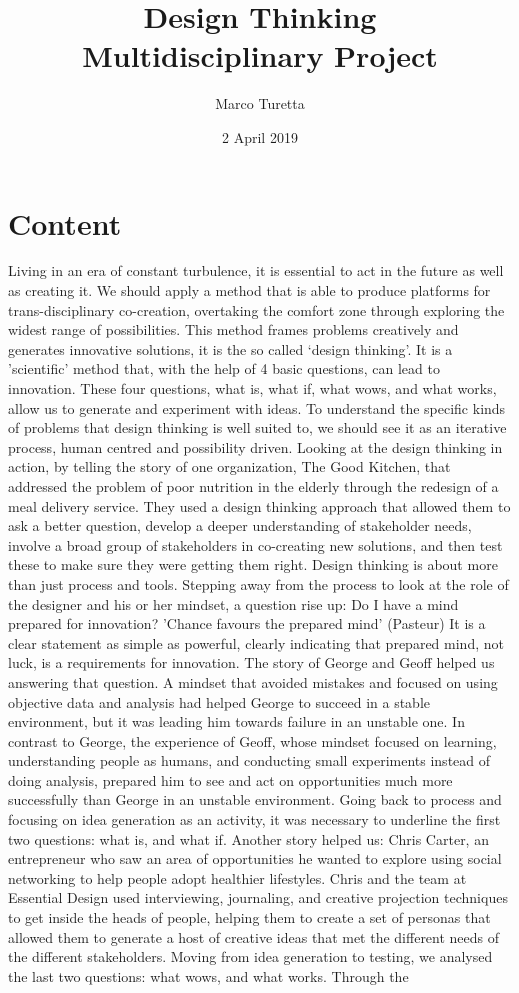 \documentclass[a4paper,9pt]{article}
\title{\textbf{ Design Thinking} \\
        \large Multidisciplinary Project}
\author{Marco Turetta}
\date{2 April 2019}
\begin{document}
\maketitle

\section{Content}
Living in an era of constant turbulence, it is essential to act in the future as well as creating it. We should apply a method that is able to produce platforms for trans-disciplinary co-creation, overtaking the comfort zone through exploring the widest range of possibilities. This method frames problems creatively and generates innovative solutions, it is the so called ‘design thinking’. It is a 'scientific' method that, with the help of 4 basic questions, can lead to innovation. These four questions, what is, what if, what wows, and what works, allow us to generate and experiment with ideas. To understand the specific kinds of problems that design thinking is well suited to, we should see it as an iterative process, human centred and possibility driven. Looking at the design thinking in action, by telling the story of one organization, The Good Kitchen, that addressed the problem of poor nutrition in the elderly through the redesign of a meal delivery service. They used a design thinking approach that allowed them to ask a better question, develop a deeper understanding of stakeholder needs, involve a broad group of stakeholders in co-creating new solutions, and then test these to make sure they were getting them right. Design thinking is about more than just process and tools. Stepping away from the process to look at the role of the designer and his or her mindset, a question rise up: Do I have a mind prepared for innovation? 'Chance favours the prepared mind' (Pasteur) It is a clear statement as simple as powerful, clearly indicating that prepared mind, not luck, is a requirements for innovation. The story of George and Geoff helped us answering that question. A mindset that avoided mistakes and focused on using objective data and analysis had helped George to succeed in a stable environment, but it was leading him towards failure in an unstable one. In contrast to George, the experience of Geoff, whose mindset focused on learning, understanding people as humans, and conducting small experiments instead of doing analysis, prepared him to see and act on opportunities much more successfully than George in an unstable environment. Going back to process and focusing on idea generation as an activity, it was necessary to underline the first two questions: what is, and what if. Another story helped us: Chris Carter, an entrepreneur who saw an area of opportunities he wanted to explore using social networking to help people adopt healthier lifestyles. Chris and the team at Essential Design used interviewing, journaling, and creative projection techniques to get inside the heads of people, helping them to create a set of personas that allowed them to generate a host of creative ideas that met the different needs of the different stakeholders. Moving from idea generation to testing, we analysed the last two questions: what wows, and what works. Through the 
\end{document}
